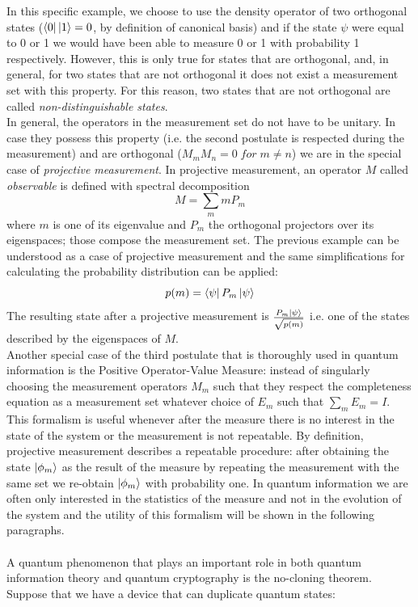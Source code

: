 \documentclass[journal, letterpaper]{IEEEtran}
\begin{document}
In this specific example, we choose to use the density operator of two orthogonal states ($\bra{0}\ket{1} = 0$, by definition of canonical basis) and if the state $\psi$ were equal to 0 or 1 we would have been able to measure 0 or 1 with probability 1 respectively. However, this is only true for states that are orthogonal, and, in general, for two states that are not orthogonal it does not exist a measurement set with this property. For this reason, two states that are not orthogonal are called \textit{non-distinguishable states}.\\
In general, the operators in the measurement set do not have to be unitary. In case they possess this property (i.e. the second postulate is respected during the measurement) and are orthogonal ($M_mM_n = 0 \; for\; m \neq n$) we are in the special case of \textit{projective measurement}. In projective measurement, an operator $M$ called \textit{observable} is defined with spectral decomposition \[M = \sum_m mP_m\] where $m$ is one of its eigenvalue and $P_m$ the orthogonal projectors over its eigenspaces; those compose the measurement set. The previous example can be understood as a case of projective measurement and the same simplifications for calculating the probability distribution can be applied:
\[ p(m) = \bra{\psi}P_m\ket{\psi}\] The resulting state after a projective measurement is \( \frac{P_m\ket{\psi}}{\sqrt{p(m)}}\) i.e. one of the states described by the eigenspaces of $M$.\\   
Another special case of the third postulate that is thoroughly used in quantum information is the Positive Operator-Value Measure: instead of singularly choosing the measurement operators $M_m$ such that they respect the completeness equation as a measurement set whatever choice of $E_m$ such that \(\sum_m E_m = I\). This formalism is useful whenever after the measure there is no interest in the state of the system or the measurement is not repeatable. By definition, projective measurement describes a repeatable procedure: after obtaining the state $\ket{\phi_m}$ as the result of the measure by repeating the measurement with the same set we re-obtain $\ket{\phi_m}$ with probability one. In quantum information we are often only interested in the statistics of the measure and not in the evolution of the system and the utility of this formalism will be shown in the following paragraphs.
\\ 
\\
A quantum phenomenon that plays an important role in both quantum information theory and quantum cryptography is the no-cloning theorem. Suppose that we have a device that can duplicate quantum states: 
\end{document}
